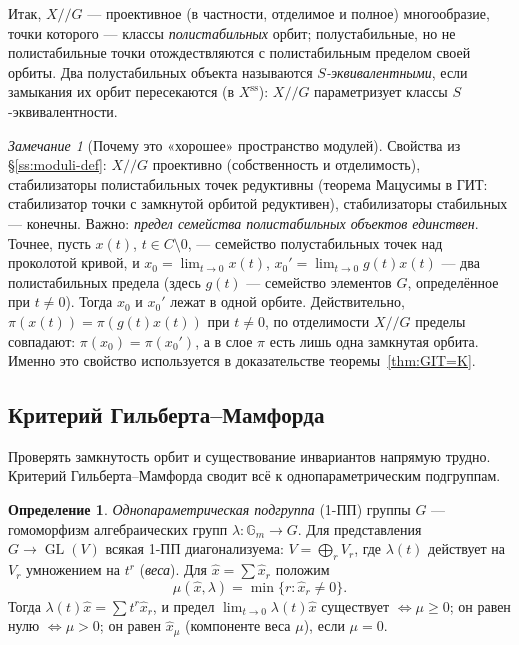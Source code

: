 \documentclass[11pt,a4paper]{article}
\theoremstyle{plain}
\theoremstyle{definition}
\newtheorem{definition}[theorem]{Определение}
\theoremstyle{remark}
\newtheorem{remark}[theorem]{Замечание}
\newcommand{\Gm}{\mathbb{G}_m}
\DeclareMathOperator{\GL}{GL}
\newcommand{\ssl}{\mathrm{ss}}
\begin{document}
Итак, $X/\!/G$ --- проективное (в частности, отделимое и полное) многообразие, точки которого
--- классы \emph{полистабильных} орбит; полустабильные, но не полистабильные точки отождествляются
с полистабильным пределом своей орбиты. Два полустабильных объекта называются
\emph{$S$-эквивалентными}, если замыкания их орбит пересекаются (в $X^{\ssl}$): $X/\!/G$
параметризует классы $S$-эквивалентности.

\begin{remark}[Почему это «хорошее» пространство модулей]
Свойства из \S\ref{ss:moduli-def}: $X/\!/G$ проективно (собственность и отделимость), стабилизаторы
полистабильных точек редуктивны (теорема Мацусимы в ГИТ: стабилизатор точки с замкнутой орбитой
редуктивен), стабилизаторы стабильных --- конечны. Важно: \emph{предел семейства полистабильных
объектов единствен}. Точнее, пусть $x(t)$, $t\in C\setminus0$, --- семейство полустабильных точек над
проколотой кривой, и $x_0=\lim_{t\to0}x(t)$, $x_0'=\lim_{t\to0}g(t)x(t)$ --- два полистабильных
предела (здесь $g(t)$ --- семейство элементов $G$, определённое при $t\ne0$). Тогда $x_0$ и $x_0'$
лежат в одной орбите. Действительно, $\pi(x(t))=\pi(g(t)x(t))$ при $t\ne0$, по отделимости
$X/\!/G$ пределы совпадают: $\pi(x_0)=\pi(x_0')$, а в слое $\pi$ есть лишь одна замкнутая орбита.
Именно это свойство используется в доказательстве теоремы~\ref{thm:GIT=K}.
\end{remark}

\subsection{Критерий Гильберта--Мамфорда}

Проверять замкнутость орбит и существование инвариантов напрямую трудно. Критерий
Гильберта--Мамфорда сводит всё к однопараметрическим подгруппам.

\begin{definition}
\emph{Однопараметрическая подгруппа} (1-ПП) группы $G$ --- гомоморфизм алгебраических групп
$\lambda\colon\Gm\to G$. Для представления $G\to\GL(V)$ всякая 1-ПП диагонализуема: $V=\bigoplus_rV_r$,
где $\lambda(t)$ действует на $V_r$ умножением на $t^r$ (\emph{веса}). Для $\hat x=\sum\hat x_r$
положим
\[
\mu(\hat x,\lambda)=\min\{r:\hat x_r\ne0\}.
\]
Тогда $\lambda(t)\hat x=\sum t^r\hat x_r$, и предел $\lim_{t\to0}\lambda(t)\hat x$ существует
$\iff\mu\ge0$; он равен нулю $\iff\mu>0$; он равен $\hat x_{\mu}$ (компоненте веса $\mu$), если $\mu=0$.
\end{definition}
\end{document}
